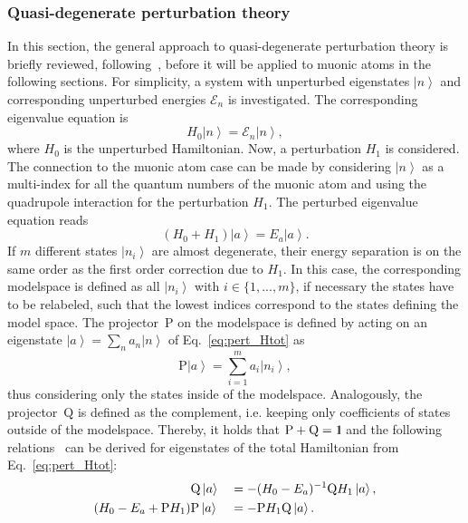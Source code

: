 \subsubsection{Quasi-degenerate perturbation theory}
\label{sec:almostDeg}
In this section, the general approach to quasi-degenerate perturbation theory is briefly reviewed, following~\cite{BorieRinker1982,sakurai1994}, before it will be applied to muonic atoms in the following sections. For simplicity, a system with unperturbed eigenstates $\left|n\right>$ and corresponding unperturbed energies $\mathcal{E}_n$ is investigated. The corresponding eigenvalue equation is
\begin{equation}
H_0 \left|n\right> = \mathcal{E}_n \left|n\right>,
\end{equation}
where $H_0$ is the unperturbed Hamiltonian. Now, a perturbation $H_1$ is considered.
The connection to the muonic atom case can be made by considering $\left|n\right>$ as a multi-index for all the quantum numbers of the muonic atom and using the quadrupole interaction for the perturbation $H_1$. The perturbed eigenvalue equation reads
\begin{equation}
\label{eq:pert_Htot}
\left(H_0 + H_1\right) \left|a\right> = E_a \left|a\right>.
\end{equation}
If $m$ different states $\left| n_i \right>$ are almost degenerate, their energy separation is on the same order as the first order correction due to $H_1$. In this case, the corresponding modelspace is defined as all $\left| n_i \right>$ with $i\in \{1,...,m\}$, if necessary the states have to be relabeled, such that the lowest indices correspond to the states defining the model space.
The projector~$\text{P}$ on the modelspace is defined by acting on an eigenstate $\left|a\right> = \sum_n a_n \left|n\right>$ of Eq.~\eqref{eq:pert_Htot} as
\begin{equation}
\text{P}\left|a\right> = \sum_{i=1}^m a_i \left|n_i\right>,
\end{equation}
thus considering only the states inside of the modelspace.
Analogously, the projector~$\text{Q}$ is defined as the complement, i.e. keeping only coefficients of states outside of the modelspace. Thereby, it holds that $\text{P}+\text{Q}=\rm 1\hspace*{-0.4ex}\rule{0.1ex}{1.52ex}\hspace*{0.2ex}$ and the following relations~\cite{BorieRinker1982} can be derived for eigenstates of the total Hamiltonian from Eq.~\eqref{eq:pert_Htot}:
\begin{alignat}{2}
&\text{Q}\left|a\right> &&= - (H_0-E_a)^{-1}\text{Q}H_1 \left|a\right>,\notag\\
 (H_0-E_a+\text{P}H_1)&\text{P}\left|a\right>&&= -\text{P}H_1\text{Q}\left|a\right>.
\end{alignat}
